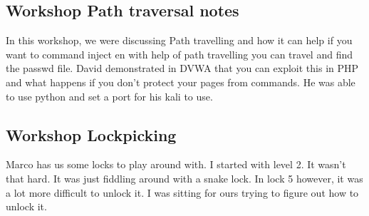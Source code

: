 \documentclass[12pt, letterpaper]{article}
\begin{document}
\subsection{Workshop Path traversal notes}
\label{workshop:path_traversal}
In this workshop, we were discussing Path travelling and how it can help if you want to command inject en with help of path travelling you can travel and find the passwd file. David demonstrated in DVWA that you can exploit this in PHP and what happens if you don't protect your pages from commands. He was able to use python and set a port for his kali to use.

\subsection{Workshop Lockpicking}
\label{workshop:week2Lockpicking}
Marco has us some locks to play around with. I started with level 2. It wasn't that hard. It was just fiddling around with a snake lock. In lock 5 however, it was a lot more difficult to unlock it. I was sitting for ours trying to figure out how to unlock it.
\hfill\break
\end{document}
